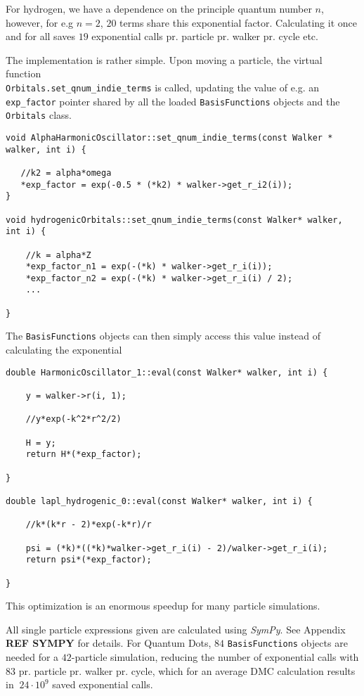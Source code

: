 For hydrogen, we have a dependence on the principle quantum number $n$, however, for e.g $n=2$,  $20$ terms share this exponential factor. Calculating it once and for all saves $19$ exponential calls pr. particle pr. walker pr. cycle etc.

The implementation is rather simple. Upon moving a particle, the virtual function \\\verb+Orbitals.set_qnum_indie_terms+ is called, updating the value of e.g. an \verb+exp_factor+ pointer shared by all the loaded \verb+BasisFunctions+ objects and the \verb+Orbitals+ class.

\begin{lstlisting}
void AlphaHarmonicOscillator::set_qnum_indie_terms(const Walker * walker, int i) {
   
   //k2 = alpha*omega 
   *exp_factor = exp(-0.5 * (*k2) * walker->get_r_i2(i));
}

void hydrogenicOrbitals::set_qnum_indie_terms(const Walker* walker, int i) {

    //k = alpha*Z
    *exp_factor_n1 = exp(-(*k) * walker->get_r_i(i));
    *exp_factor_n2 = exp(-(*k) * walker->get_r_i(i) / 2);
    ...

}
\end{lstlisting}

The \verb+BasisFunctions+ objects can then simply access this value instead of calculating the exponential 

\begin{lstlisting}
double HarmonicOscillator_1::eval(const Walker* walker, int i) {

    y = walker->r(i, 1);
    
    //y*exp(-k^2*r^2/2)
    
    H = y;
    return H*(*exp_factor);
    
}

double lapl_hydrogenic_0::eval(const Walker* walker, int i) {
    
    //k*(k*r - 2)*exp(-k*r)/r
    
    psi = (*k)*((*k)*walker->get_r_i(i) - 2)/walker->get_r_i(i);
    return psi*(*exp_factor);
    
}
\end{lstlisting}

This optimization is an enormous speedup for many particle simulations.

All single particle expressions given are calculated using \textit{SymPy}. See Appendix \textbf{REF SYMPY} for details. For Quantum Dots, $84$ \verb+BasisFunctions+ objects are needed for a $42$-particle simulation, reducing the number of exponential calls with $83$ pr. particle pr. walker pr. cycle, which for an average DMC calculation results in $~24\cdot 10^9$ saved exponential calls.


